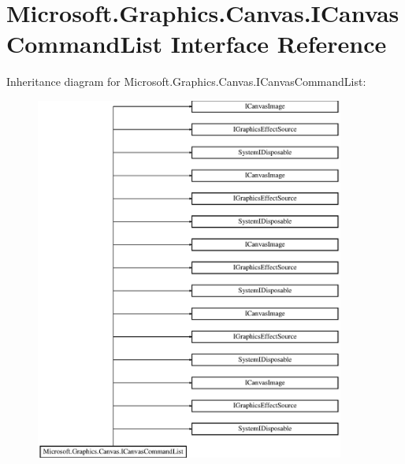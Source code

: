 \hypertarget{interface_microsoft_1_1_graphics_1_1_canvas_1_1_i_canvas_command_list}{}\section{Microsoft.\+Graphics.\+Canvas.\+I\+Canvas\+Command\+List Interface Reference}
\label{interface_microsoft_1_1_graphics_1_1_canvas_1_1_i_canvas_command_list}
Inheritance diagram for Microsoft.\+Graphics.\+Canvas.\+I\+Canvas\+Command\+List\+:\begin{figure}[H]
\begin{center}
\leavevmode
\includegraphics[height=12.000000cm]{interface_microsoft_1_1_graphics_1_1_canvas_1_1_i_canvas_command_list}
\end{center}
\end{figure}
